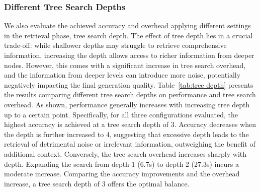 \subsubsection{Different Tree Search Depths}


We also evaluate the achieved accuracy and overhead applying different settings in the retrieval phase, \ie tree search depth. The effect of tree depth lies in a crucial trade-off: while shallower depths may struggle to retrieve comprehensive information, increasing the depth allows access to richer information from deeper nodes. However, this comes with a significant increase in tree search overhead, and the information from deeper levels can introduce more noise, potentially negatively impacting the final generation quality. Table~\ref{tab:tree depth} presents the results comparing different tree search depths on performance and tree search overhead. As shown, performance generally increases with increasing tree depth up to a certain point. Specifically, for all three \sysname{} configurations evaluated, the highest accuracy is achieved at a tree search depth of 3. Accuracy decreases when the depth is further increased to 4, suggesting that excessive depth leads to the retrieval of detrimental noise or irrelevant information, outweighing the benefit of additional context. Conversely, the tree search overhead increases sharply with depth. Expanding the search from depth 1 (6.7s) to depth 2 (27.3s) incurs a moderate increase. 
Comparing the accuracy improvements and the overhead increase, a tree search depth of 3 offers the optimal balance. 

\label{subsub:depth}
\begin{table}[t!]
\centering
{}
\caption{The achieved accuracy and overhead when applying different tree search depths in the agentic search of \sysname evaluated on the subset of LVBench.}
\vspace{-1em}
\label{tab:tree depth}
\end{table}







